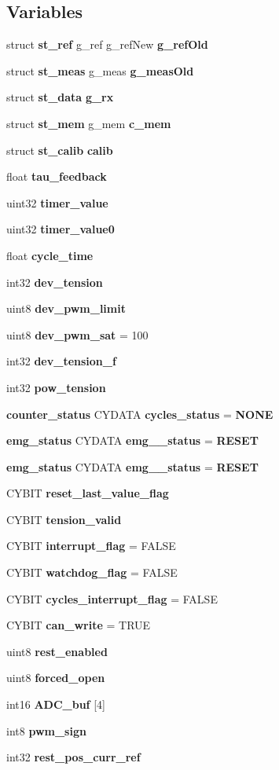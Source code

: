 \subsection*{Variables}
\begin{DoxyCompactItemize}
\item 
struct \textbf{ st\+\_\+ref} g\+\_\+ref g\+\_\+ref\+New \textbf{ g\+\_\+ref\+Old}
\item 
struct \textbf{ st\+\_\+meas} g\+\_\+meas \textbf{ g\+\_\+meas\+Old}
\item 
struct \textbf{ st\+\_\+data} \textbf{ g\+\_\+rx}
\item 
struct \textbf{ st\+\_\+mem} g\+\_\+mem \textbf{ c\+\_\+mem}
\item 
struct \textbf{ st\+\_\+calib} \textbf{ calib}
\item 
float \textbf{ tau\+\_\+feedback}
\item 
uint32 \textbf{ timer\+\_\+value}
\item 
uint32 \textbf{ timer\+\_\+value0}
\item 
float \textbf{ cycle\+\_\+time}
\item 
int32 \textbf{ dev\+\_\+tension}
\item 
uint8 \textbf{ dev\+\_\+pwm\+\_\+limit}
\item 
uint8 \textbf{ dev\+\_\+pwm\+\_\+sat} = 100
\item 
int32 \textbf{ dev\+\_\+tension\+\_\+f}
\item 
int32 \textbf{ pow\+\_\+tension}
\item 
\textbf{ counter\+\_\+status} C\+Y\+D\+A\+TA \textbf{ cycles\+\_\+status} = \textbf{ N\+O\+NE}
\item 
\textbf{ emg\+\_\+status} C\+Y\+D\+A\+TA \textbf{ emg\+\_\+\_\+status} = \textbf{ R\+E\+S\+ET}
\item 
\textbf{ emg\+\_\+status} C\+Y\+D\+A\+TA \textbf{ emg\+\_\+\_\+status} = \textbf{ R\+E\+S\+ET}
\item 
C\+Y\+B\+IT \textbf{ reset\+\_\+last\+\_\+value\+\_\+flag}
\item 
C\+Y\+B\+IT \textbf{ tension\+\_\+valid}
\item 
C\+Y\+B\+IT \textbf{ interrupt\+\_\+flag} = F\+A\+L\+SE
\item 
C\+Y\+B\+IT \textbf{ watchdog\+\_\+flag} = F\+A\+L\+SE
\item 
C\+Y\+B\+IT \textbf{ cycles\+\_\+interrupt\+\_\+flag} = F\+A\+L\+SE
\item 
C\+Y\+B\+IT \textbf{ can\+\_\+write} = T\+R\+UE
\item 
uint8 \textbf{ rest\+\_\+enabled}
\item 
uint8 \textbf{ forced\+\_\+open}
\item 
\mbox{\label{globals_8c_abb22f0a4462a0b4db27496654f2175a0}} 
int16 {\bfseries A\+D\+C\+\_\+buf} [4]
\item 
int8 \textbf{ pwm\+\_\+sign}
\item 
int32 \textbf{ rest\+\_\+pos\+\_\+curr\+\_\+ref}
\end{DoxyCompactItemize}


